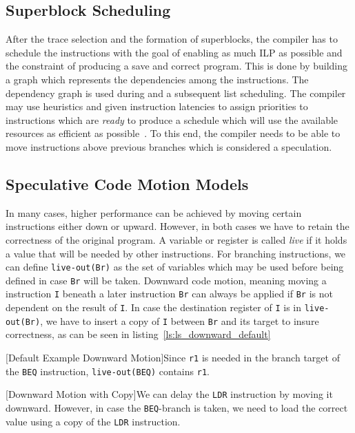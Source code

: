 \subsection{Superblock Scheduling}
After the trace selection and the formation of superblocks, the compiler has to schedule the instructions with the goal of enabling as much ILP as possible and the constraint of producing a save and correct program. This is done by building a graph which represents the dependencies among the instructions. The dependency graph is used during and a subsequent list scheduling. The compiler may use heuristics and given instruction latencies to assign priorities to instructions which are \textit{ready} to produce a schedule which will use the available resources as efficient as possible~\cite{chang95}. To this end, the compiler needs to be able to move instructions above previous branches which is considered a speculation. 

\subsection{Speculative Code Motion Models}
In many cases, higher performance can be achieved by moving certain instructions either down or upward. However, in both cases we have to retain the correctness of the original program. A variable or register is called \textit{live} if it holds a value that will be needed by other instructions.  For branching instructions, we can define \texttt{live-out(Br)} as the set of variables which may be used before being defined in case \texttt{Br} will be taken. Downward code motion, meaning moving a instruction \texttt{I} beneath a later instruction \texttt{Br} can always be applied if \texttt{Br} is not dependent on the result of \texttt{I}. In case the destination register of \texttt{I} is in \texttt{live-out(Br)}, we have to insert a copy of \texttt{I} between \texttt{Br} and its target to insure correctness, as can be seen in listing~\ref{ls:ls_downward_default}

\begin{center}
    \begin{minipage}{.45\textwidth}
        \centering
        
        \captionsetup{type=listing}
        [Default Example Downward Motion]{Since \texttt{r1} is needed in the branch target of the \texttt{BEQ} instruction, \texttt{live-out(BEQ)} contains \texttt{r1}.}
        \label{ls:ls_downward_default}
    \end{minipage}\hfill
    \begin{minipage}{.45\textwidth}
        \centering
        
        \captionsetup{type=listing}
        [Downward Motion with Copy]{We can delay the \texttt{LDR} instruction by moving it downward. However, in case the \texttt{BEQ}-branch is taken, we need to load the correct value using a copy of the \texttt{LDR} instruction.}
    \end{minipage}
\end{center}

